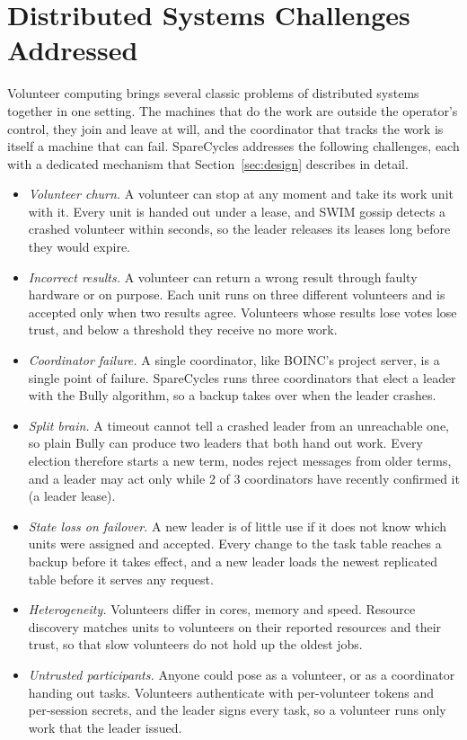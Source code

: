\section{Distributed Systems Challenges Addressed}
\label{sec:challenges}

Volunteer computing brings several classic problems of distributed systems together in one setting. The machines that do the work are outside the operator's control, they join and leave at will, and the coordinator that tracks the work is itself a machine that can fail. SpareCycles addresses the following challenges, each with a dedicated mechanism that Section~\ref{sec:design} describes in detail.

\begin{itemize}
\item \emph{Volunteer churn.} A volunteer can stop at any moment and take its work unit with it. Every unit is handed out under a lease, and SWIM gossip detects a crashed volunteer within seconds, so the leader releases its leases long before they would expire.
\item \emph{Incorrect results.} A volunteer can return a wrong result through faulty hardware or on purpose. Each unit runs on three different volunteers and is accepted only when two results agree. Volunteers whose results lose votes lose trust, and below a threshold they receive no more work.
\item \emph{Coordinator failure.} A single coordinator, like BOINC's project server, is a single point of failure. SpareCycles runs three coordinators that elect a leader with the Bully algorithm, so a backup takes over when the leader crashes.
\item \emph{Split brain.} A timeout cannot tell a crashed leader from an unreachable one, so plain Bully can produce two leaders that both hand out work. Every election therefore starts a new term, nodes reject messages from older terms, and a leader may act only while 2 of 3 coordinators have recently confirmed it (a leader lease).
\item \emph{State loss on failover.} A new leader is of little use if it does not know which units were assigned and accepted. Every change to the task table reaches a backup before it takes effect, and a new leader loads the newest replicated table before it serves any request.
\item \emph{Heterogeneity.} Volunteers differ in cores, memory and speed. Resource discovery matches units to volunteers on their reported resources and their trust, so that slow volunteers do not hold up the oldest jobs.
\item \emph{Untrusted participants.} Anyone could pose as a volunteer, or as a coordinator handing out tasks. Volunteers authenticate with per-volunteer tokens and per-session secrets, and the leader signs every task, so a volunteer runs only work that the leader issued.
\end{itemize}
